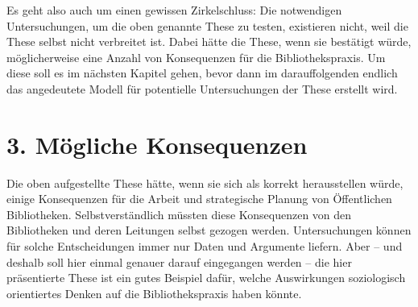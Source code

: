 \documentclass[a4paper,
fontsize=11pt,
oneside,
numbers=noperiodatend,
parskip=half-,
bibliography=totoc,
final
]{scrartcl}
\begin{document}
Es geht also auch um einen gewissen Zirkelschluss: Die notwendigen
Untersuchungen, um die oben genannte These zu testen, existieren nicht,
weil die These selbst nicht verbreitet ist. Dabei hätte die These, wenn
sie bestätigt würde, möglicherweise eine Anzahl von Konsequenzen für die
Bibliothekspraxis. Um diese soll es im nächsten Kapitel gehen, bevor
dann im darauffolgenden endlich das angedeutete Modell für potentielle
Untersuchungen der These erstellt wird.

\hypertarget{muxf6gliche-konsequenzen}{%
\section{3. Mögliche
Konsequenzen}\label{muxf6gliche-konsequenzen}}

Die oben aufgestellte These hätte, wenn sie sich als korrekt
herausstellen würde, einige Konsequenzen für die Arbeit und strategische
Planung von Öffentlichen Bibliotheken. Selbstverständlich müssten diese
Konsequenzen von den Bibliotheken und deren Leitungen selbst gezogen
werden. Untersuchungen können für solche Entscheidungen immer nur Daten
und Argumente liefern. Aber -- und deshalb soll hier einmal genauer
darauf eingegangen werden -- die hier präsentierte These ist ein gutes
Beispiel dafür, welche Auswirkungen soziologisch orientiertes Denken auf
die Bibliothekspraxis haben könnte.
\end{document}
